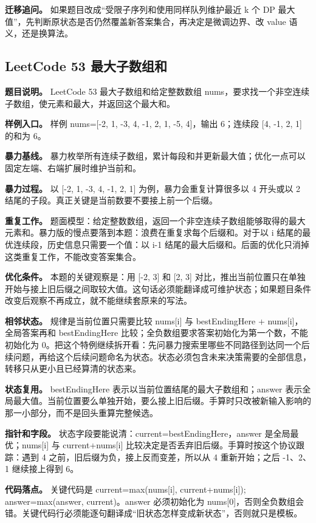 \textbf{迁移追问。} 如果题目改成“受限子序列和使用同样队列维护最近 k 个 DP 最大值”，先判断原状态是否仍然覆盖新答案集合，再决定是微调边界、改 value 语义，还是换算法。

\subsection{LeetCode 53 最大子数组和}

\textbf{题目说明。} LeetCode 53 最大子数组和给定整数数组 nums，要求找一个非空连续子数组，使元素和最大，并返回这个最大和。

\textbf{样例入口。} 样例 nums=[-2, 1, -3, 4, -1, 2, 1, -5, 4]，输出 6；连续段 [4, -1, 2, 1] 的和为 6。

\textbf{暴力基线。} 暴力枚举所有连续子数组，累计每段和并更新最大值；优化一点可以固定左端、右端扩展时维护当前和。

\textbf{暴力过程。} 以 [-2, 1, -3, 4, -1, 2, 1] 为例，暴力会重复计算很多以 4 开头或以 2 结尾的子段。真正关键是当前数要不要接上前一个后缀。

\textbf{重复工作。} 题面模型：给定整数数组，返回一个非空连续子数组能够取得的最大元素和。暴力版的慢点要落到本题：浪费在重复求每个后缀和。对于以 i 结尾的最优连续段，历史信息只需要一个值：以 i-1 结尾的最大后缀和。后面的优化只消掉这类重复工作，不能改变答案集合。

\textbf{优化条件。} 本题的关键观察是：用 [-2, 3] 和 [2, 3] 对比，推出当前位置只在单独开始与接上旧后缀之间取较大值。这句话必须能翻译成可维护状态；如果题目条件改变后观察不再成立，就不能继续套原来的写法。

\textbf{相邻状态。} 规律是当前位置只需要比较 nums[i] 与 bestEndingHere + nums[i]，全局答案再和 bestEndingHere 比较；全负数组要求答案初始化为第一个数，不能初始化为 0。把这个特例继续拆开看：先问暴力搜索里哪些不同路径到达同一个后续问题，再给这个后续问题命名为状态。状态必须包含未来决策需要的全部信息，转移只从更小且已经算清的状态来。

\textbf{状态复用。} bestEndingHere 表示以当前位置结尾的最大子数组和；answer 表示全局最大值。当前位置要么单独开始，要么接上旧后缀。手算时只改被新输入影响的那一小部分，而不是回头重算完整候选。

\textbf{指针和字段。} 状态字段要能说清：current=bestEndingHere，answer 是全局最优；nums[i] 与 current+nums[i] 比较决定是否丢弃旧后缀。手算时按这个协议跟踪：遇到 4 之前，旧后缀为负，接上反而变差，所以从 4 重新开始；之后 -1、2、1 继续接上得到 6。

\textbf{代码落点。} 关键代码是 current=max(nums[i], current+nums[i]); answer=max(answer, current)。answer 必须初始化为 nums[0]，否则全负数组会错。关键代码行必须能逐句翻译成“旧状态怎样变成新状态”，否则就只是模板。

